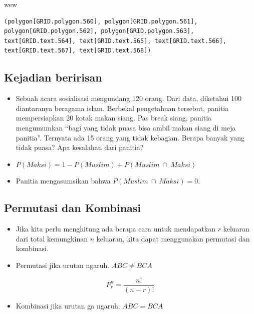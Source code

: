 \documentclass[
  letterpaper,
  DIV=11,
  numbers=noendperiod]{scrartcl}
\newenvironment{Shaded}{\begin{snugshade}}{\end{snugshade}}
\newcommand{\NormalTok}[1]{\textcolor[rgb]{0.00,0.23,0.31}{#1}}
\providecommand{\tightlist}{%
  \setlength{\itemsep}{0pt}\setlength{\parskip}{0pt}}\usepackage{longtable,booktabs,array}
\begin{document}
\begin{Shaded}
\begin{Highlighting}[]
\NormalTok{wew}
\end{Highlighting}
\end{Shaded}

\begin{verbatim}
(polygon[GRID.polygon.560], polygon[GRID.polygon.561], polygon[GRID.polygon.562], polygon[GRID.polygon.563], text[GRID.text.564], text[GRID.text.565], text[GRID.text.566], text[GRID.text.567], text[GRID.text.568]) 
\end{verbatim}

\hypertarget{kejadian-beririsan-3}{%
\subsection{Kejadian beririsan}\label{kejadian-beririsan-3}}

\begin{itemize}
\item
  Sebuah acara sosialisasi mengundang 120 orang. Dari data, diketahui
  100 diantaranya beragama islam. Berbekal pengetahuan tersebut, panitia
  mempersiapkan 20 kotak makan siang. Pas break siang, panitia
  mengumumkan ``bagi yang tidak puasa bisa ambil makan siang di meja
  panitia''. Ternyata ada 15 orang yang tidak kebagian. Berapa banyak
  yang tidak puasa? Apa kesalahan dari panitia?
\item
  \(P(Maksi)=1-P(Muslim)+P(Muslim \ \cap \ Maksi)\)
\item
  Panitia mengasumsikan bahwa \(P(Muslim \ \cap \ Maksi) = 0\).
\end{itemize}

\hypertarget{permutasi-dan-kombinasi}{%
\subsection{Permutasi dan Kombinasi}\label{permutasi-dan-kombinasi}}

\begin{itemize}
\item
  Jika kita perlu menghitung ada berapa cara untuk mendapatkan \(r\)
  keluaran dari total kemungkinan \(n\) keluaran, kita dapat menggunakan
  permutasi dan kombinasi.
\item
  Permutasi jika urutan ngaruh. \(ABC \neq BCA\)
\end{itemize}

\[
P^n_r=\frac{n!}{(n-r)!}
\]

\begin{itemize}
\tightlist
\item
  Kombinasi jika urutan ga ngaruh. \(ABC=BCA\)
\end{itemize}
\end{document}
